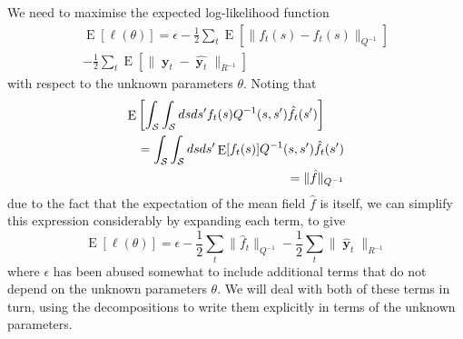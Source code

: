 \documentclass{IEEEtran}
\newcommand{\dist}[2]{\|#1\|_{#2}}
\DeclareMathOperator{\E}{E}
\DeclareMathOperator{\yvec}{\mathbf{y}}
\begin{document}
We need to maximise the expected log-likelihood function
\begin{equation}
	\begin{split}
	\E[\ell(\theta)] = \epsilon - \frac{1}{2}\sum_t\E[\dist{f_t(s) - \hat{f}_t(s)}{Q^{-1}}]  \\
	- \frac{1}{2}\sum_t\E[\dist{\yvec_t-\hat{\yvec_t}}{R^{-1}}]
	\end{split}
\end{equation}
with respect to the unknown parameters $\theta$. Noting that 
\begin{eqnarray}
	\lefteqn{\E\left[\int_\mathcal{S}\int_\mathcal{S}ds ds' f_t(s) Q^{-1}(s,s') \hat{f}_t(s')\right] } \nonumber \\ 
		&& = \int_\mathcal{S}\int_\mathcal{S}ds ds' \E[f_t(s)] Q^{-1}(s,s') \hat{f}_t(s') \\
		&& = \dist{\hat{f}}{Q^{-1}}
\end{eqnarray}
due to the fact that the expectation of the mean field $\hat{f}$ is itself, we can simplify this expression considerably by expanding each term, to give
\begin{equation}
	\label{eqn:exloglik}
	\E[\ell(\theta)] = \epsilon  - 
	\frac{1}{2}\sum_t \dist{\hat{f}_t}{Q^{-1}}
	- \frac{1}{2}\sum_t \dist{\hat{\yvec}_t}{R^{-1}}
\end{equation}
where $\epsilon$ has been abused somewhat to include additional terms that do not depend on the unknown parameters $\theta$. We will deal with both of these terms in turn, using the decompositions to write them explicitly in terms of the unknown parameters.
\end{document}

